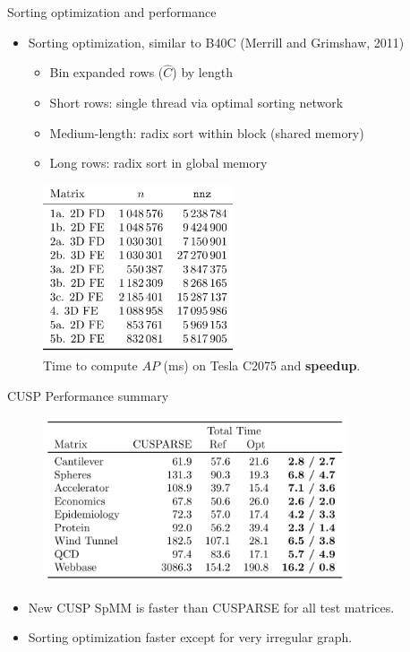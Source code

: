 \documentclass{beamer}
\begin{document}
\begin{frame}{Sorting optimization and performance}
  \begin{itemize}
  \item Sorting optimization, similar to B40C (Merrill and Grimshaw, 2011)
    \begin{itemize}
    \item Bin expanded rows ($\hat C$) by length
    \item Short rows: single thread via optimal sorting network
    \item Medium-length: radix sort within block (shared memory)
    \item Long rows: radix sort in global memory
    \end{itemize}
  \end{itemize}
  \begin{figure}
    \centering
    \includegraphics[width=0.5\textwidth]{figures/MG/SACUSPMaticesFE.png}
    \caption{Time to compute $AP$ (ms) on Tesla C2075 and {\bf speedup}.}
  \end{figure}
\end{frame}

\begin{frame}{CUSP Performance summary}
  \begin{figure}
    \centering
    \includegraphics[width=0.8\textwidth]{figures/MG/SACUSPSpeedupAP}
  \end{figure}  
  \begin{itemize}
  \item New CUSP SpMM is faster than CUSPARSE for all test matrices.
  \item Sorting optimization faster except for very irregular graph.
  \end{itemize}
\end{frame}
\end{document}

